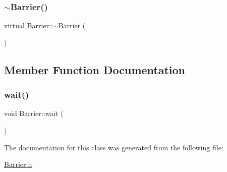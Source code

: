 \subsubsection{\texorpdfstring{$\sim$\+Barrier()}{~Barrier()}}
{\footnotesize\ttfamily virtual Barrier\+::$\sim$\+Barrier (\begin{DoxyParamCaption}{ }\end{DoxyParamCaption})\hspace{0.3cm}{\ttfamily [virtual]}}



\subsection{Member Function Documentation}
\mbox{\label{class_barrier_a83a9d2e85e98b3d2081538bf0da29b60}} 
\subsubsection{\texorpdfstring{wait()}{wait()}}
{\footnotesize\ttfamily void Barrier\+::wait (\begin{DoxyParamCaption}{ }\end{DoxyParamCaption})}



The documentation for this class was generated from the following file\+:\begin{DoxyCompactItemize}
\item 
\hyperlink{_barrier_8h}{Barrier.\+h}\end{DoxyCompactItemize}
